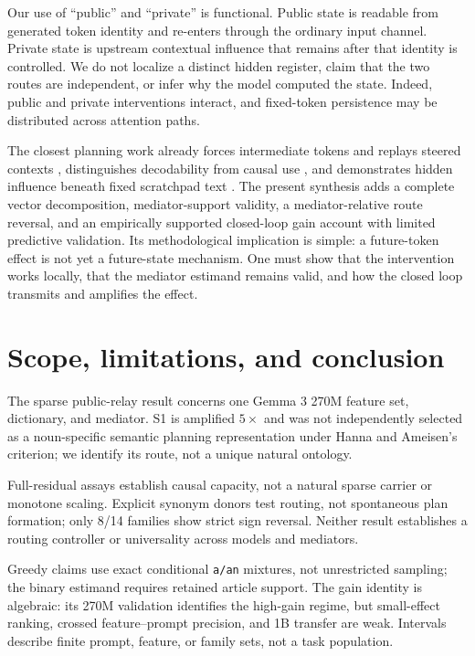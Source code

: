 \documentclass[
]{article}
\begin{document}
Our use of ``public'' and ``private'' is functional. Public state is
readable from generated token identity and re-enters through the
ordinary input channel. Private state is upstream contextual influence
that remains after that identity is controlled. We do not localize a
distinct hidden register, claim that the two routes are independent, or
infer why the model computed the state. Indeed, public and private
interventions interact, and fixed-token persistence may be distributed
across attention paths.

The closest planning work already forces intermediate tokens and replays
steered contexts \citep{hanna2026latent}, distinguishes decodability
from causal use \citep{ma2026plan}, and demonstrates hidden influence
beneath fixed scratchpad text \citep{shih2026registers}. The present
synthesis adds a complete vector decomposition, mediator-support
validity, a mediator-relative route reversal, and an empirically
supported closed-loop gain account with limited predictive validation.
Its methodological implication is simple: a future-token effect is not
yet a future-state mechanism. One must show that the intervention works
locally, that the mediator estimand remains valid, and how the closed
loop transmits and amplifies the effect.

\section{Scope, limitations, and
conclusion}\label{scope-limitations-and-conclusion}

The sparse public-relay result concerns one Gemma 3 270M feature set,
dictionary, and mediator. S1 is amplified \(5\times\) and was not
independently selected as a noun-specific semantic planning
representation under Hanna and Ameisen's criterion; we identify its
route, not a unique natural ontology.

Full-residual assays establish causal capacity, not a natural sparse
carrier or monotone scaling. Explicit synonym donors test routing, not
spontaneous plan formation; only 8/14 families show strict sign
reversal. Neither result establishes a routing controller or
universality across models and mediators.

Greedy claims use exact conditional \texttt{a/an} mixtures, not
unrestricted sampling; the binary estimand requires retained article
support. The gain identity is algebraic: its 270M validation identifies
the high-gain regime, but small-effect ranking, crossed feature--prompt
precision, and 1B transfer are weak. Intervals describe finite prompt,
feature, or family sets, not a task population.
\end{document}
